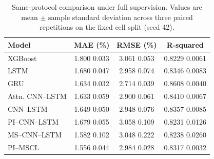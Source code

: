 \begin{table}[htbp]
\caption{Same-protocol comparison under full supervision. Values are mean $\pm$ sample standard deviation across three paired repetitions on the fixed cell split (seed 42).}
\label{tab:all_models_full_supervision}
\centering
\setlength{\tabcolsep}{3.0pt}
\begin{tabular*}{\textwidth}{@{\extracolsep{\fill}}lccc@{}}
\toprule
Model & MAE (\%) & RMSE (\%) & R-squared \\
\midrule
XGBoost & 1.800 \textpm{} 0.033 & 3.061 \textpm{} 0.053 & 0.8229 \textpm{} 0.0061 \\
LSTM & 1.680 \textpm{} 0.047 & 2.958 \textpm{} 0.074 & 0.8346 \textpm{} 0.0083 \\
GRU & 1.634 \textpm{} 0.032 & 2.714 \textpm{} 0.039 & 0.8608 \textpm{} 0.0040 \\
Attn. CNN--LSTM & 1.633 \textpm{} 0.059 & 2.900 \textpm{} 0.061 & 0.8410 \textpm{} 0.0067 \\
CNN--LSTM & 1.649 \textpm{} 0.050 & 2.948 \textpm{} 0.076 & 0.8357 \textpm{} 0.0085 \\
PI--CNN--LSTM & 1.679 \textpm{} 0.055 & 3.058 \textpm{} 0.109 & 0.8231 \textpm{} 0.0126 \\
MS--CNN--LSTM & 1.582 \textpm{} 0.102 & 3.048 \textpm{} 0.222 & 0.8238 \textpm{} 0.0260 \\
PI--MSCL & 1.556 \textpm{} 0.044 & 2.984 \textpm{} 0.028 & 0.8317 \textpm{} 0.0032 \\
\bottomrule
\end{tabular*}
\end{table}
